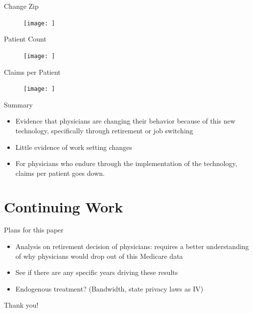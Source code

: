 \documentclass[10pt]{beamer}
\begin{document}
\begin{frame}{Change Zip}
\begin{figure}[ht]
    \centering
    \texttt{[image: ]}
\end{figure}
\end{frame}

\begin{frame}{Patient Count}
\begin{figure}[ht]
    \centering
    \texttt{[image: ]}
\end{figure}
\end{frame}

\begin{frame}{Claims per Patient}
\begin{figure}[ht]
    \centering
    \texttt{[image: ]}
\end{figure}
\end{frame}

\begin{frame}{Summary}
\begin{itemize}
    \item Evidence that physicians are changing their behavior because of this new technology, specifically through retirement or job switching
    \item Little evidence of work setting changes
    \item For physicians who endure through the implementation of the technology, claims per patient goes down. 
    
\end{itemize}
\end{frame}







\section{Continuing Work}

\begin{frame}{Plans for this paper}
    \begin{itemize}
        \item Analysis on retirement decision of physicians: requires a better understanding of why physicians would drop out of this Medicare data
        \item See if there are any specific years driving these results
        \item Endogenous treatment? (Bandwidth, state privacy laws as IV)
    \end{itemize}
\end{frame}

\begin{frame}[plain]{}
\centering
    Thank you!
\end{frame}
\end{document}

